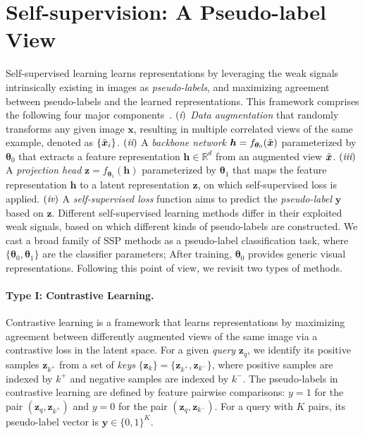 \documentclass[10pt,twocolumn,letterpaper]{article}
\newcommand{\RN}[1]{\textup{\lowercase\expandafter{\it \romannumeral#1}}}
\newcommand{\hv}[0]{{\boldsymbol{h}}}
\newcommand{\xv}{\boldsymbol{x}}
\newcommand{\yv}{\boldsymbol{y}}
\newcommand{\zv}{\boldsymbol{z}}
\newcommand{\thetav}{\boldsymbol{\theta}}
\newcommand{\R}{\mathbb{R}}
\begin{document}
\section{Self-supervision: A Pseudo-label View}


Self-supervised learning learns representations
by leveraging the weak signals intrinsically existing in images as {\em pseudo-labels}, and  
maximizing agreement between pseudo-labels and the learned representations. This framework
comprises the following four major components~\cite{chen2020simple}.
$(\RN{1})$ {\em Data augmentation} that randomly transforms
any given image $\xv$, resulting in multiple correlated views of the same example, denoted as $\{ \Tilde{\xv}_i \}$.
$(\RN{2})$ A {\em backbone network} $\hv = f_{\thetav_0}(\Tilde{\xv})$ parameterized by $\thetav_0$ that extracts a feature representation $\hv \in \R^d$ from an augmented view $ \Tilde{\xv}$.
$(\RN{3})$ A {\em projection head} $\zv = f_{\thetav_1}(\hv)$ parameterized by $\thetav_1$ that maps the feature
representation $\hv$ to a latent representation $\zv$, on which self-supervised loss is
applied. 
$(\RN{4})$
A {\em  self-supervised loss} function aims to predict the {\em pseudo-label} $\yv$ based on $\zv$. Different self-supervised learning methods differ in their exploited weak signals, based on which different kinds of pseudo-labels are constructed. We cast a broad family of SSP methods as a pseudo-label classification task, where $\{\thetav_0,\thetav_1\}$ are the classifier parameters; After training, $\thetav_0$ provides generic visual representations.
Following this point of view, we revisit two types of methods. 


\paragraph{Type I: Contrastive Learning.}
Contrastive learning is a framework that learns representations
by maximizing agreement between differently augmented
views of the same image via a contrastive loss in
the latent space.
For a given {\em query} $\zv_q$,  we identify its positive samples $\zv_{k^+}$ from a set of {\em keys} $\{\zv_k\} = \{\zv_{k^+}, \zv_{k^-} \}$, where positive samples are indexed by $k^+$ and negative samples are indexed by $k^-$. The pseudo-labels in contrastive learning are defined by feature pairwise comparisons: $y=1$ for the pair $(\zv_q, \zv_{k^+})$ and $y=0$ for the pair $(\zv_q, \zv_{k^-})$. For a query with $K$ pairs, its pseudo-label vector is $\yv \in \{0,1\}^K$. 
\end{document}
